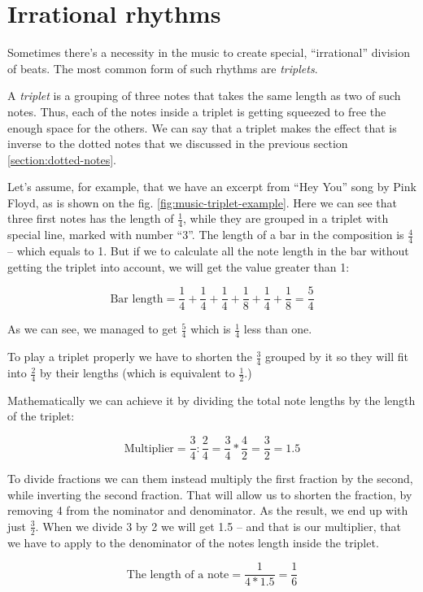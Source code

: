 \documentclass[../sparc.tex]{subfiles}
\begin{document}
\section{Irrational rhythms}

Sometimes there's a necessity in the music to create special, ``irrational''
division of beats.  The most common form of such rhythms are \emph{triplets}.

A \emph{triplet} is a grouping of three notes that takes the same length as two
of such notes.  Thus, each of the notes inside a triplet is getting squeezed to
free the enough space for the others.  We can say that a triplet makes the
effect that is inverse to the dotted notes that we discussed in the previous
section \ref{section:dotted-notes}.


Let's assume, for example, that we have an excerpt from ``Hey You'' song by Pink
Floyd, as is shown on the fig. \ref{fig:music-triplet-example}.  Here we can see
that three first notes has the length of $\frac{1}{4}$, while they are grouped
in a triplet with special line, marked with number ``3''.  The length of a bar
in the composition is $\frac{4}{4}$ -- which equals to 1.  But if we to calculate
all the note length in the bar without getting the triplet into account, we will
get the value greater than 1:

\begin{equation}
  \mbox{Bar length} = \frac{1}{4} + \frac{1}{4}
  + \frac{1}{4} + \frac{1}{8} + \frac{1}{4} + \frac{1}{8} = \frac{5}{4}
\end{equation}

As we can see, we managed to get $\frac{5}{4}$ which is $\frac{1}{4}$ less than
one.

To play a triplet properly we have to shorten the $\frac{3}{4}$ grouped by it so
they will fit into $\frac{2}{4}$ by their lengths (which is equivalent to
$\frac{1}{2}$.)

Mathematically we can achieve it by dividing the total note lengths by the
length of the triplet:

\begin{equation}
  \mbox{Multiplier} = \frac{3}{4} : \frac{2}{4} = \frac{3}{4} * \frac{4}{2}
  = \frac{3}{2} = 1.5
\end{equation}

To divide fractions we can them instead multiply the first fraction by the
second, while inverting the second fraction.  That will allow us to shorten the
fraction, by removing 4 from the nominator and denominator.  As the result, we
end up with just $\frac{3}{2}$.  When we divide 3 by 2 we will get 1.5 -- and
that is our multiplier, that we have to apply to the denominator of the notes
length inside the triplet.

\begin{equation}
  \mbox{The length of a note} = \frac{1}{4 * 1.5} = \frac{1}{6}
\end{equation}
\end{document}
